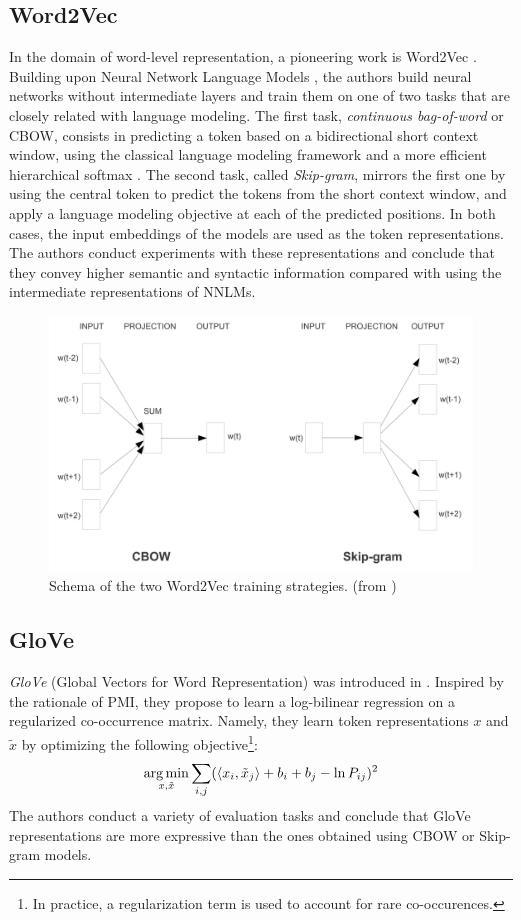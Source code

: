 \subsection{Word2Vec} In the domain of word-level representation, a pioneering work is Word2Vec \citep{word2vec}. Building upon Neural Network Language Models \citep{bengio2000neural}, the authors build neural networks without intermediate layers and train them on one of two tasks that are closely related with language modeling. The first task, \textit{continuous bag-of-word} or CBOW, consists in predicting a token based on a bidirectional short context window, using the classical language modeling framework and a more efficient hierarchical softmax \citep{pmlr-vR5-morin05a}. The second task, called \textit{Skip-gram}, mirrors the first one by using the central token to predict the tokens from the short context window, and apply a language modeling objective at each of the predicted positions. In both cases, the input embeddings of the models are used as the token representations. The authors conduct experiments with these representations and conclude that they convey higher semantic and syntactic information compared with using the intermediate representations of NNLMs.
\begin{figure}[ht]
  \centering
  \includegraphics[width=0.7\linewidth]{sources/related_works/imgs/word2vec.png}
  \caption{Schema of the two Word2Vec training strategies. (from \citet{word2vec})}
  \label{fig:word2vec}
\end{figure}

\subsection{GloVe} 
\textit{GloVe} (Global Vectors for Word Representation) was introduced in \citet{pennington-etal-2014-glove}. Inspired by the rationale of PMI, they propose to learn a log-bilinear regression on a regularized co-occurrence matrix. Namely, they learn token representations $x$ and $\tilde{x}$ by optimizing the following objective\footnote{In practice, a regularization term is used to account for rare co-occurences.}:
$$
\operatorname*{arg\,min}_{x, \tilde{x}} \sum_{i, j} (\langle x_i, \tilde{x}_j \rangle + b_i + b_j - \ln P_{ij})^2
$$
The authors conduct a variety of evaluation tasks and conclude that GloVe representations are more expressive than the ones obtained using CBOW or Skip-gram models.

